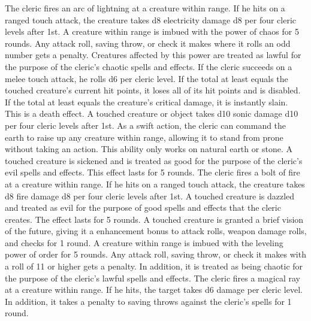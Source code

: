  The cleric fires an arc of lightning at a creature within \rngmed range. If he hits on a ranged touch attack, the creature takes d8 electricity damage \add d8 per four cleric levels after 1st.
 A creature within \rngclose range is imbued with the power of chaos for 5 rounds. Any attack roll, saving throw, or check it makes where it rolls an odd number gets a  penalty. Creatures affected by this power are treated as lawful for the purpose of the cleric's chaotic spells and effects.
 If the cleric succeeds on a melee touch attack, he rolls d6 per cleric level. If the total at least equals the touched creature's current hit points, it loses all of its hit points and is disabled. If the total at least equals the creature's critical damage, it is instantly slain. This is a death effect.
 A touched creature or object takes d10 sonic damage \add d10 per four cleric levels after 1st.
 As a swift action, the cleric can command the earth to raise up any creature within \rngclose range, allowing it to stand from prone without taking an action. This ability only works on natural earth or stone.
 A touched creature is sickened and is treated as good for the purpose of the cleric's evil spells and effects. This effect lasts for 5 rounds.
 The cleric fires a bolt of fire at a creature within \rngclose range. If he hits on a ranged touch attack, the creature takes d8 fire damage \add d8 per four cleric levels after 1st.
 A touched creature is dazzled and treated as evil for the purpose of good spells and effects that the cleric creates. The effect lasts for 5 rounds.
 A touched creature is granted a brief vision of the future, giving it a  enhancement bonus to attack rolls, weapon damage rolls, and checks for 1 round.
 A creature within \rngclose range is imbued with the leveling power of order for 5 rounds. Any attack roll, saving throw, or check it makes with a roll of 11 or higher gets a  penalty. In addition, it is treated as being chaotic for the purpose of the cleric's lawful spells and effects.
 The cleric fires a magical ray at a creature within \rngclose range. If he hits, the target takes d6 damage  per cleric level. In addition, it takes a  penalty to saving throws against  the cleric's spells for 1 round.

